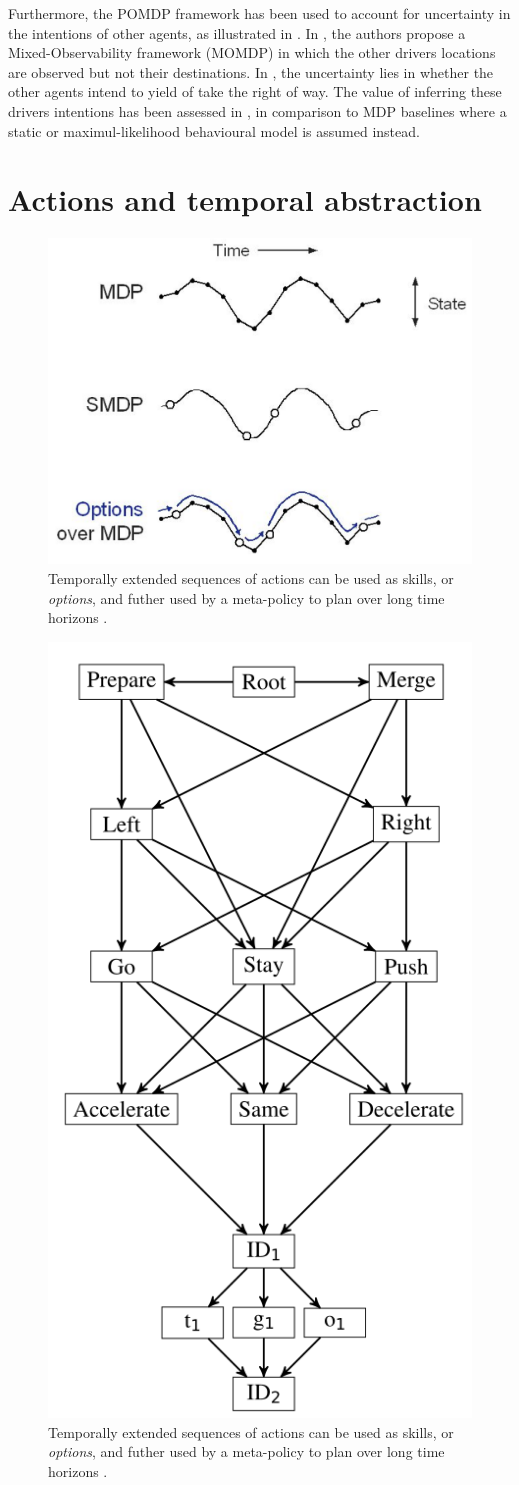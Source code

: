 Furthermore, the POMDP framework has been used to account for uncertainty in the intentions of other agents, as illustrated in . In \citep{Bandyopadhyay2013}, the authors propose a Mixed-Observability framework (MOMDP) in which the other drivers locations are observed but not their destinations. In \citep{Barbier2018}, the uncertainty lies in whether the other agents intend to yield of take the right of way. The value of inferring these drivers intentions has been assessed in \citep{Sunberg2017}, in comparison to MDP baselines where a static or maximul-likelihood behavioural model is assumed instead.



\section{Actions and temporal abstraction}

\begin{figure}
	\centering
	\includegraphics[width=0.5\linewidth]{img/smdp}
	\caption{Temporally extended sequences of actions can be used as skills, or \emph{options}, and futher used by a meta-policy to plan over long time horizons \citep{Sutton1999}.}
	\label{fig:smdp}
\end{figure}
\begin{figure}
	\centering
	\includegraphics[width=0.3\linewidth]{img/options}
	\caption{Temporally extended sequences of actions can be used as skills, or \emph{options}, and futher used by a meta-policy to plan over long time horizons \citep{Sutton1999}.}
	\label{fig:options-graph}
\end{figure}


